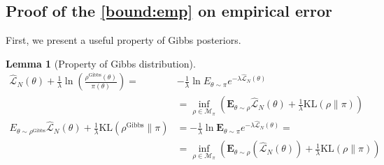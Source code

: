 \documentclass{article}
\newcommand{\KL}{\mathrm{KL}}
\renewcommand{\KL}{\mathrm{KL}}
\newtheorem{lemma}[theorem]{Lemma}
\newcommand{\bE}{\mathbf{E}}
\begin{document}
\subsection{Proof of the \eqref{bound:emp} on empirical error}
First, we present a useful property of Gibbs posteriors.  
 \begin{lemma}[Property of Gibbs distribution]
  \label{lem:gibbs_property}
  \begin{align}
    \hat{\mathcal{L}}_N(\theta)+\frac{1}{\lambda}\ln\left(\frac{\rho^{\text{Gibbs}}(\theta)}{\pi(\theta)}\right) 
       = &  -\frac{1}{\lambda}\ln E_{\theta \sim \pi} e^{-\lambda \hat{\mathcal{L}}_N(\theta)} \nonumber \\
    & =\inf_{\rho \in \mathcal{M}_{\pi}} \left(\bE_{\theta \sim \rho} \hat{\mathcal{L}}_N(\theta) + \frac{1}{\lambda} \KL(\rho\|\pi)\right)
  \label{lem:gibbs_property:eq1} \\
   E_{\theta \sim \rho^{\text{Gibbs}}}\hat{\mathcal{L}}_N(\theta)+\frac{1}{\lambda} 
      \KL(\rho^{\text{Gibbs}}\|\pi) & =  -\frac{1}{\lambda} \ln   \bE_{\theta \sim \pi} e^{-\lambda \hat{\mathcal{L}}_N(\theta)} = \nonumber \\
    & =\inf_{\rho \in \mathcal{M}_{\pi}} \left(\bE_{\theta \sim \rho}(\hat{\mathcal{L}}_N(\theta)) + \frac{1}{\lambda} \KL(\rho\|\pi)\right)
  \label{lem:gibbs_property:eq2}
  \end{align}
 \end{lemma}
\end{document}
